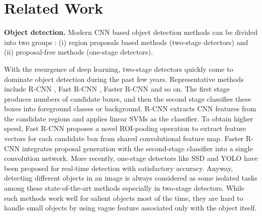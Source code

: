 \documentclass[10pt,twocolumn,letterpaper]{article}
\begin{document}



\section{Related Work}
{\bf Object detection.} Modern CNN based object detection methods can be divided into two groups \cite{Focal, DSOD}: (i) region proposals based methods (two-stage detectors) and (ii) proposal-free methods (one-stage detectors).

With the resurgence of deep learning, two-stage detectors quickly come to dominate object detection during the past few years. Representative methods include R-CNN \cite{RCNN}, Fast R-CNN \cite{Fast}, Faster R-CNN \cite{Faster} and so on. The first stage produces numbers of candidate boxes, and then the second stage classifies these boxes into foreground classes or background. 
R-CNN \cite{RCNN} extracts CNN features from the candidate regions and applies linear SVMs as the classifier. 
To obtain higher speed, Fast R-CNN \cite{Fast} proposes a novel ROI-pooling operation to extract feature vectors for each candidate box from shared convolutional feature map. Faster R-CNN \cite{Faster} integrates proposal generation with the second-stage classifier into a single convolution network. 
More recently, one-stage detectors like SSD \cite{SSD} and YOLO \cite{YOLO} have been proposed for real-time detection with satisfactory accuracy. Anyway, detecting different objects in an image is always considered as some isolated tasks among these state-of-the-art methods especially in two-stage detectors. While such methods work well for salient objects most of the time, they are hard to handle small objects by using vague feature associated only with the object itself. 
\end{document}
